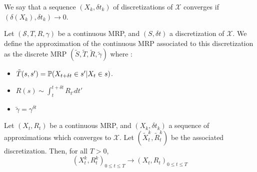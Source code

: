 \documentclass{article}
\begin{document}
\begin{definition}
  We say that a sequence $(X_{k}, \delta t_{k})$ of discretizations of $\mathcal{X}$ converges if $(\delta(X_{k}), \delta t_{k}) \rightarrow 0$. 
\end{definition}


\begin{definition}
  Let $(\mathcal{S}, T, R, \gamma)$ be a continuous MRP, and $(S, \delta t)$ a discretization of $\mathcal{X}$. We define the approximation of the continuous MRP associated to this discretization as the discrete MRP $(\tilde S, \tilde{T}, \tilde{R}, \tilde{\gamma})$ where :
  \begin{itemize}
  \item $\tilde{T}(s,s') = \mathbb{P}(X_{t+\delta t}\in s' | X_{t}\in s)$. 
  \item $R(s) \sim \int_{t}^{t+\delta t}R_{t'}dt'$
  \item $\tilde{\gamma} = \gamma^{\delta t}$ 
  \end{itemize}
\end{definition}


\begin{theorem}
  Let $(X_{t}, R_{t})$ be a continuous MRP, and $(X_{k}, \delta t_{k})$ a sequence of approximations which converges to $\mathcal{X}$. Let $(\tilde{X}^{k}_{t}, \tilde{R}^{k}_{t})$ be the associated discretization. Then, for all $T > 0$,
  \begin{equation}
    (X^{k}_{t}, R^{k}_{t})_{0 \leq t \leq T} \rightarrow (X_{t}, R_{t})_{0 \leq t \leq T}
  \end{equation}
\end{theorem}
\end{document}
